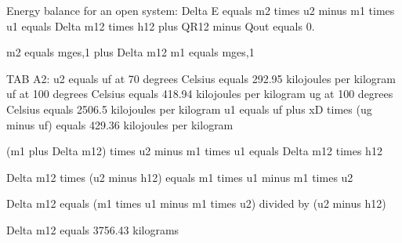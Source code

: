 Energy balance for an open system:  
Delta E equals m2 times u2 minus m1 times u1 equals Delta m12 times h12 plus QR12 minus Qout equals 0.  

m2 equals mges,1 plus Delta m12  
m1 equals mges,1  

TAB A2:  
u2 equals uf at 70 degrees Celsius equals 292.95 kilojoules per kilogram  
uf at 100 degrees Celsius equals 418.94 kilojoules per kilogram  
ug at 100 degrees Celsius equals 2506.5 kilojoules per kilogram  
u1 equals uf plus xD times (ug minus uf)  
equals 429.36 kilojoules per kilogram  

(m1 plus Delta m12) times u2 minus m1 times u1 equals Delta m12 times h12  

Delta m12 times (u2 minus h12) equals m1 times u1 minus m1 times u2  

Delta m12 equals (m1 times u1 minus m1 times u2) divided by (u2 minus h12)  

Delta m12 equals 3756.43 kilograms